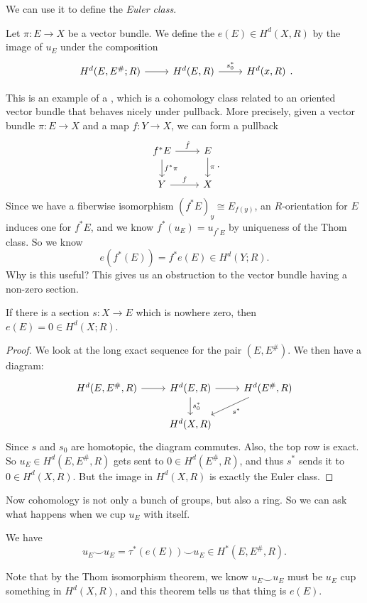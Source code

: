 \documentclass[a4paper]{article}
\begin{document}
We can use it to define the \emph{Euler class}.
\begin{defi}
  Let $\pi: E \to X$ be a vector bundle. We define the  $e(E) \in H^d(X, R)$ by the image of $u_E$ under the composition
  \[
    \begin{tikzcd}
      H^d(E, E^\#; R) \ar[r] & H^d(E, R) \ar[r, "s_0^*"] & H^d(x, R)
    \end{tikzcd}.
  \]
\end{defi}
This is an example of a , which is a cohomology class related to an oriented vector bundle that behaves nicely under pullback. More precisely, given a vector bundle $\pi: E \to X$ and a map $f: Y \to X$, we can form a pullback
\[
  \begin{tikzcd}
    f^*E \ar[r, "\hat{f}"] \ar[d, "f^*\pi"] & E \ar[d, "\pi"]\\
    Y \ar[r, "f"] & X
  \end{tikzcd}.
\]
Since we have a fiberwise isomorphism $(f^*E)_y \cong E_{f(y)}$, an $R$-orientation for $E$ induces one for $f^* E$, and we know $f^*(u_E) = u_{f^* E}$ by uniqueness of the Thom class. So we know
\[
  e(f^*(E)) = f^* e(E) \in H^d(Y; R).
\]
Why is this useful? This gives us an obstruction to the vector bundle having a non-zero section.
\begin{thm}
  If there is a section $s: X \to E$ which is nowhere zero, then $e(E) = 0 \in H^d(X; R)$.
\end{thm}

\begin{proof}
  We look at the long exact sequence for the pair $(E, E^\#)$. We then have a diagram:
  \[
    \begin{tikzcd}
      H^d(E, E^\#, R) \ar[r] & H^d(E, R) \ar[r] \ar[d, "s_0^*"] & H^d(E^\#, R) \ar[dl, "s^*"]\\
      & H^d(X, R)
    \end{tikzcd}
  \]
  Since $s$ and $s_0$ are homotopic, the diagram commutes. Also, the top row is exact. So $u_E \in H^d(E, E^\#, R)$ gets sent to $0 \in H^d(E^\#, R)$, and thus $s^*$ sends it to $0 \in H^d(X, R)$. But the image in $H^d(X, R)$ is exactly the Euler class.
\end{proof}

Now cohomology is not only a bunch of groups, but also a ring. So we can ask what happens when we cup $u_E$ with itself.
\begin{thm}
  We have
  \[
    u_E \smile u_E = \tau^*(e(E)) \smile u_E \in H^*(E, E^\#, R).
  \]
\end{thm}
Note that by the Thom isomorphism theorem, we know $u_E \smile u_E$ must be $u_E$ cup something in $H^d(X, R)$, and this theorem tells us that thing is $e(E)$.
\end{document}
